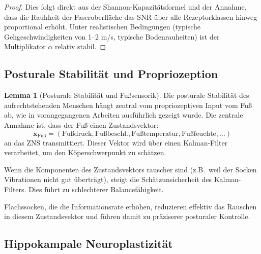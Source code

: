 \documentclass[a4paper,12pt]{article}
\theoremstyle{definition}
\newtheorem{lemma}{Lemma}
\begin{document}
\begin{proof}
Dies folgt direkt aus der Shannon-Kapazitätsformel und der Annahme, dass die Rauhheit der Faseroberfläche das SNR über alle Rezeptorklassen hinweg proportional erhöht. Unter realistischen Bedingungen (typische Gehgeschwindigkeiten von 1--2 m/s, typische Bodenrauheiten) ist der Multiplikator $\alpha$ relativ stabil.
\end{proof}

\subsection{Posturale Stabilität und Propriozeption}

\begin{lemma}[Posturale Stabilität und Fußsensorik]
Die posturale Stabilität des aufrechtstehenden Menschen hängt zentral vom propriozeptiven Input vom Fuß ab, wie in vorangegangenen Arbeiten ausführlich gezeigt wurde. Die zentrale Annahme ist, dass der Fuß einen Zustandsvektor:
\[
\mathbf{x}_{\text{Fuß}} = (\text{Fußdruck}, \text{Fußbeschl.}, \text{Fußtemperatur}, \text{Fußfeuchte}, \ldots)
\]
an das ZNS transmittiert. Dieser Vektor wird über einen Kalman-Filter verarbeitet, um den Köperschwerpunkt zu schätzen.

Wenn die Komponenten des Zustandsvektors rauscher sind (z.B.\ weil der Socken Vibrationen nicht gut überträgt), steigt die Schätzunsicherheit des Kalman-Filters. Dies führt zu schlechterer Balancefähigkeit.

Flachssocken, die die Informationsrate erhöhen, reduzieren effektiv das Rauschen in diesem Zustandsvektor und führen damit zu präziserer posturaler Kontrolle.
\end{lemma}

\subsection{Hippokampale Neuroplastizität}
\end{document}
